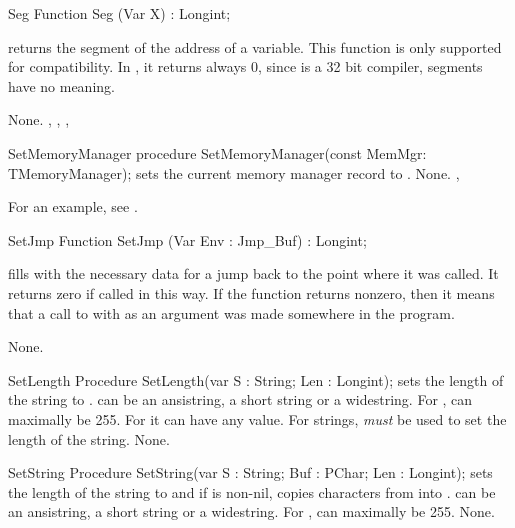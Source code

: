 
\begin{function}{Seg}
\Declaration
Function Seg (Var X) : Longint;

\Description
{} returns the segment of the address of a variable.
This function is only supported for compatibility. In \fpc, it
returns always 0, since \fpc is a 32 bit compiler, segments have no meaning.

\Errors
None.
\SeeAlso
{}, , , 
\end{function}


\begin{procedure}{SetMemoryManager}
\Declaration
procedure SetMemoryManager(const MemMgr: TMemoryManager);
\Description
{} sets the current memory manager record to
.
\Errors
None.
\SeeAlso
{}, 
\end{procedure}

For an example, see \progref.

\begin{function}{SetJmp}
\Declaration
Function SetJmp (Var Env : Jmp\_Buf) : Longint;

\Description

 fills  with the necessary data for a jump back to the
point where it was called. It returns zero if called in this way.
If the function returns nonzero, then it means that a call to 
with  as an argument was made somewhere in the program.

\Errors
None.
\SeeAlso
{}
\end{function}



\begin{procedure}{SetLength}
\Declaration
Procedure SetLength(var S : String; Len : Longint);
\Description
{} sets the length of the string  to . 
can be an ansistring, a short string or a widestring.
For ,  can maximally be 255. For 
it can have any value. For  strings,  {\em
must} be used to set the length of the string.
\Errors
None.
\SeeAlso
{}
\end{procedure}



\begin{procedure}{SetString}
\Declaration
Procedure SetString(var S : String; Buf : PChar; Len : Longint);
\Description
{} sets the length of the string  to  and
if  is non-nil, copies  characters from  
into .   can be an ansistring, a short string or a widestring.
For ,  can maximally be 255. 
\Errors
None.
\SeeAlso
{}
\end{procedure}



